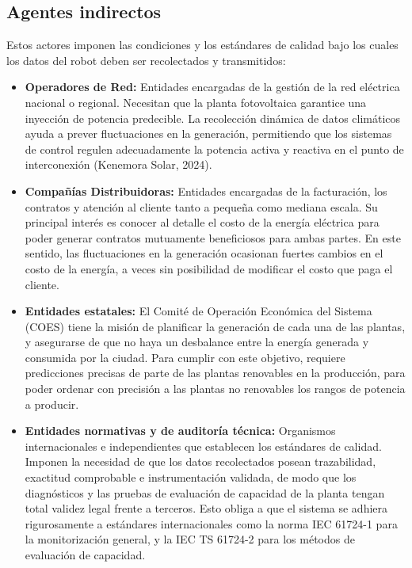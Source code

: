 \subsection{Agentes indirectos}
Estos actores imponen las condiciones y los estándares de calidad bajo los cuales los datos del robot deben ser recolectados y transmitidos:

\begin{itemize}

    \item \textbf{Operadores de Red:} Entidades encargadas de la gestión de la red eléctrica nacional o regional. Necesitan que la planta fotovoltaica garantice una inyección de potencia predecible. La recolección dinámica de datos climáticos ayuda a prever fluctuaciones en la generación, permitiendo que los sistemas de control regulen adecuadamente la potencia activa y reactiva en el punto de interconexión (Kenemora Solar, 2024).
    
    \item \textbf{Compañías Distribuidoras:} Entidades encargadas de la facturación, los contratos y atención al cliente tanto a pequeña como mediana escala. Su principal interés es conocer al detalle el costo de la energía eléctrica para poder generar contratos mutuamente beneficiosos para ambas partes. En este sentido, las fluctuaciones en la generación ocasionan fuertes cambios en el costo de la energía, a veces sin posibilidad de modificar el costo que paga el cliente.
    
    \item \textbf{Entidades estatales:} El Comité de Operación Económica del Sistema (COES) tiene la misión de planificar la generación de cada una de las plantas, y asegurarse de que no haya un desbalance entre la energía generada y consumida por la ciudad. Para cumplir con este objetivo, requiere predicciones precisas de parte de las plantas renovables en la producción, para poder ordenar con precisión a las plantas no renovables los rangos de potencia a producir.
    
    \item \textbf{Entidades normativas y de auditoría técnica:} Organismos internacionales e independientes que establecen los estándares de calidad. Imponen la necesidad de que los datos recolectados posean trazabilidad, exactitud comprobable e instrumentación validada, de modo que los diagnósticos y las pruebas de evaluación de capacidad de la planta tengan total validez legal frente a terceros. Esto obliga a que el sistema se adhiera rigurosamente a estándares internacionales como la norma IEC 61724-1 para la monitorización general, y la IEC TS 61724-2 para los métodos de evaluación de capacidad.

\end{itemize}

